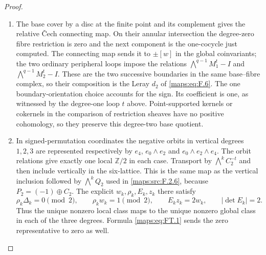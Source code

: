 \documentclass[11pt,a4paper]{article}
\theoremstyle{definition}
\begin{document}
\begin{proof}
\begin{enumerate}[label=\arabic*.]
\item The base cover by a disc at the finite point and its
complement gives the relative \v{C}ech connecting map.  On their
annular intersection the degree-zero fibre restriction is zero and
the next component is the one-cocycle just computed.
The connecting map sends it to $\pm[w]$ in the global coinvariants;
the two ordinary peripheral loops impose the relations
$\bigwedge^{q-1}M_1^t-I$ and $\bigwedge^{q-1}M_2^t-I$.
These are the two successive boundaries in the same base--fibre
complex, so their composition is the Leray $d_2$ of
\eqref{maps:eq:F.6}.  The one boundary-orientation choice accounts
for the sign.  Its coefficient is one, as witnessed by the
degree-one loop $t$ above.  Point-supported kernels or cokernels in
the comparison of restriction sheaves have no positive cohomology,
so they preserve this degree-two base quotient.

\item In signed-permutation coordinates the negative orbits in
vertical degrees $1,2,3$ are represented respectively by
$e_4$, $e_0\wedge e_2$ and $e_0\wedge e_2\wedge e_4$.
The orbit relations give exactly one local $\mathbb Z/2$ in each
case.  Transport by $\bigwedge^kC_2^{-t}$ and then include vertically
in the six-lattice.  This is the same map as the vertical inclusion
followed by $\bigwedge^kQ_2$ used in
\cref{maps:src:F.2.6}, because $P_2=(-1)\oplus C_2$.
The explicit $w_k,\rho_k,E_k,z_k$ there satisfy
\[
 \rho_k\Delta_k=0\pmod2,\qquad
 \rho_kw_k=1\pmod2,\qquad E_kz_k=2w_k,
 \qquad |\det E_k|=2.
\]
Thus the unique nonzero local class maps to the unique nonzero
global class in each of the three degrees.  Formula
\eqref{maps:eq:FT.1} sends the zero representative to zero as well.
\end{enumerate}
\end{proof}
\end{document}
